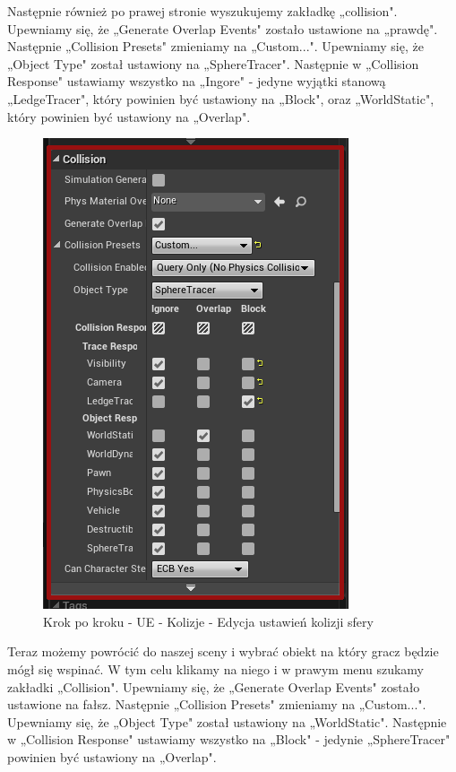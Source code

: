 \documentclass[openright]{xmgr}
\begin{document}
Następnie również po prawej stronie wyszukujemy zakładkę „collision". Upewniamy się, że „Generate Overlap Events" zostało ustawione na „prawdę". Następnie „Collision Presets" zmieniamy na „Custom...". Upewniamy się, że „Object Type" został ustawiony na „SphereTracer". Następnie w „Collision Response" ustawiamy wszystko na „Ingore" - jedyne wyjątki stanową „LedgeTracer", który powinien być ustawiony na „Block", oraz „WorldStatic", który powinien być ustawiony na „Overlap".

\begin{figure}[!htb]
    \begin{center}
    \includegraphics[scale=0.35]{Screeny/UeKrokPoKroku/UE-Climb-Sphere03.png}
    \end{center}
    \caption{Krok po kroku - UE - Kolizje - Edycja ustawień kolizji sfery}
\end{figure}
\newpage

Teraz możemy powrócić do naszej sceny i wybrać obiekt na który gracz będzie mógł się wspinać. W tym celu klikamy na niego i w prawym menu szukamy zakładki „Collision". Upewniamy się, że „Generate Overlap Events" zostało ustawione na fałsz. Następnie „Collision Presets" zmieniamy na „Custom...". Upewniamy się, że „Object Type" został ustawiony na „WorldStatic". Następnie w „Collision Response" ustawiamy wszystko na „Block" - jedynie „SphereTracer" powinien być ustawiony na „Overlap".
\end{document}
